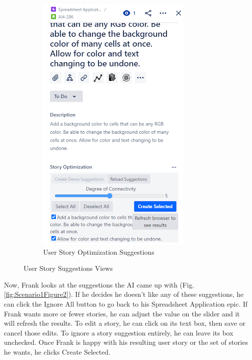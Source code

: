\begin{figure}[ht]
\begin{subfigure}{.5\textwidth}
\includegraphics[width=.8\linewidth,keepaspectratio]{./figure/Scenario1Figure3.png}
\caption{User Story Optimization Suggestions}
\label{fig:Scenario1Figure3}
\end{subfigure}
\caption{User Story Suggestions Views}
\end{figure}

Now, Frank looks at the suggestions the AI came up with (Fig. \ref{fig:Scenario1Figure2}). If he decides he doesn’t like any of these suggestions, he can click the Ignore All button to go back to his Spreadsheet Application epic. If Frank wants more or fewer stories, he can adjust the value on the slider and it will refresh the results. To edit a story, he can click on its text box, then save or cancel those edits. To ignore a story suggestion entirely, he can leave its box unchecked. Once Frank is happy with his resulting user story or the set of stories he wants, he clicks Create Selected. 

